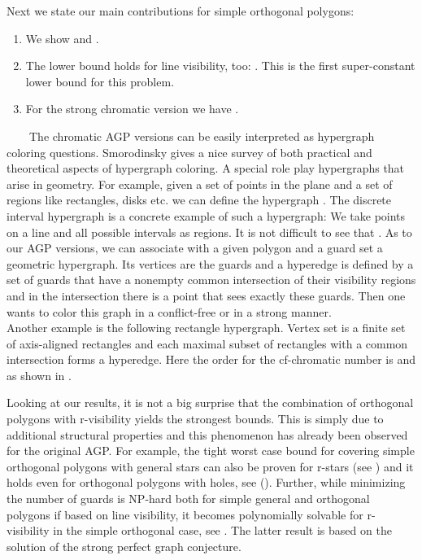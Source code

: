 \documentclass[a4paper,USenglish,numberwithinsect]{lipics}
\theoremstyle{plain}
\begin{document}
Next we state our main  contributions for simple orthogonal polygons:\vspace*{0.2cm}
\begin{enumerate}
\item We show    and 
.
\item The lower bound holds for line visibility, too: . This is the first super-constant
lower bound for this problem.
\item  For the strong chromatic version  we have .
\end{enumerate}
\vspace*{0.2cm}
\ \ \ \ The chromatic AGP versions  can be easily interpreted as  hypergraph coloring 
questions. Smorodinsky \cite{Smo} gives a nice survey of both
practical and theoretical aspects of hypergraph coloring.
A special role play hypergraphs that arise in geometry. For example,
given a set of points  in the plane and a set of regions 
like rectangles, disks etc. we can define the hypergraph . The discrete interval
hypergraph   is a concrete example of such a hypergraph:
We take  points on a line and all possible intervals as regions. It
is not difficult to see that .
As to our AGP versions, we can associate with a given polygon and a guard set a geometric hypergraph.
Its vertices are the guards and a hyperedge is defined by a set of guards that have a nonempty common intersection of their visibility regions and in the intersection there is
a point that sees exactly these guards.  Then one wants to color this graph in a conflict-free or in a strong manner. \\
Another  example is the following  rectangle hypergraph.
Vertex set is a finite set of  axis-aligned rectangles and each
maximal subset of rectangles with a common intersection forms a
hyperedge. Here
the order for the cf-chromatic number is  and
 as shown in \cite{Smo,PaTo}.

Looking at our results,  it is  not a big surprise that the 
combination of orthogonal polygons with r-visibility yields the
strongest bounds. This is simply due to additional structural properties and this  phenomenon has already been observed for the original AGP. For example, the  tight
worst case bound for covering simple orthogonal polygons with general
stars can also be proven for r-stars (see \cite{ORourke}) and it
holds even for orthogonal polygons with holes, see (\cite{Hoff}).
Further, while minimizing the number of guards is NP-hard both for
simple general and orthogonal polygons if based on line visibility, it
becomes polynomially solvable for r-visibility in the simple orthogonal
case, see \cite{MRS,Wor}. The latter result is based on the solution of
the strong perfect graph conjecture.
\end{document}
